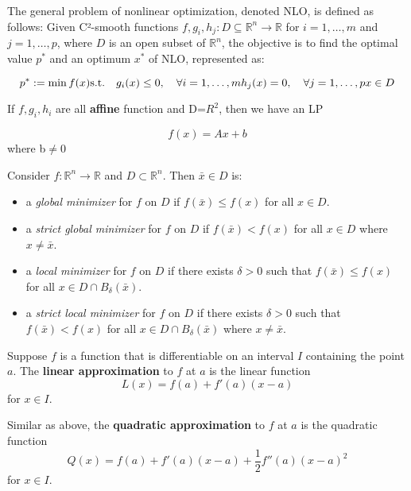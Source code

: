 \begin{definition}
    The general problem of nonlinear optimization, denoted NLO, is defined as follows: Given C²-smooth functions
\(f, g_i, h_j : D \subseteq \mathbb{R}^n \rightarrow \mathbb{R}\) for \(i = 1, \ldots, m\) and \(j = 1, \ldots, p\), where \(D\) is an open subset of \(\mathbb{R}^n\), the objective is to find the optimal value \(p^*\) and an optimum \(x^*\) of NLO, represented as:

\[
p^* := \min f(x) \\
\text{s.t.} \quad g_i(x) \leq 0, \quad \forall i = 1, \ldots, m \\
h_j(x) = 0, \quad \forall j = 1, \ldots, p \\
x \in D
\]

If $f,g_i,h_i$ are all \textbf{affine} function and D=$R^2$, then we have an LP
\end{definition}

\begin{definition}[affine]
\begin{equation}
    f(x) = Ax + b
\end{equation}
where b$\neq$0

\end{definition}
\begin{definition}
    Consider \(f : \mathbb{R}^n \rightarrow \mathbb{R}\) and \(D \subset \mathbb{R}^n\). Then \(\bar{x} \in D\) is:

\begin{itemize}
    \item a \textit{global minimizer} for \(f\) on \(D\) if \(f(\bar{x}) \leq f(x)\) for all \(x \in D\).
    \item a \textit{strict global minimizer} for \(f\) on \(D\) if \(f(\bar{x}) < f(x)\) for all \(x \in D\) where \(x \neq \bar{x}\).
    \item a \textit{local minimizer} for \(f\) on \(D\) if there exists \(\delta > 0\) such that \(f(\bar{x}) \leq f(x)\) for all \(x \in D \cap B_\delta(\bar{x})\).
    \item a \textit{strict local minimizer} for \(f\) on \(D\) if there exists \(\delta > 0\) such that \(f(\bar{x}) < f(x)\) for all \(x \in D \cap B_\delta(\bar{x})\) where \(x \neq \bar{x}\).
\end{itemize}
\end{definition}
\begin{definition}
    Suppose $f$ is a function that is differentiable on an interval $I$ containing the point $a$. The \textbf{linear approximation} to $f$ at $a$ is the linear function $$L(x) = f(a) + f'(a)(x-a)$$ for $x \in I$.
\end{definition}
\begin{definition}
    Similar as above, the \textbf{quadratic approximation} to $f$ at $a$ is the quadratic function $$Q(x) = f(a) + f'(a)(x-a) + \frac{1}{2}f''(a)(x-a)^2$$ for $x \in I$.
\end{definition}

% 


